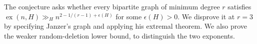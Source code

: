 The conjecture asks whether every bipartite graph of minimum degree $r$ satisfies $\operatorname{ex}(n,H)\gg_H n^{2-1/(r-1)+\epsilon(H)}$ for some $\epsilon(H)>0$. We disprove it at $r=3$ by specifying Janzer's graph and applying his extremal theorem. We also prove the weaker random-deletion lower bound, to distinguish the two exponents.
